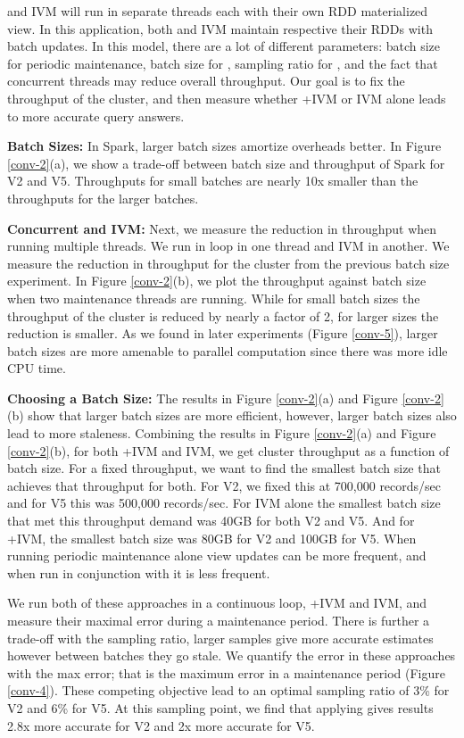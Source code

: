 \svc and IVM will run in separate threads each with their own RDD materialized view.
In this application, both \svc and IVM maintain respective their RDDs with batch updates.
In this model, there are a lot of different parameters: batch size for periodic maintenance, batch size for \svc, sampling ratio for \svc, and the fact that concurrent threads may reduce overall throughput.
Our goal is to fix the throughput of the cluster, and then measure whether \svcnospace+IVM or IVM alone leads to more accurate query answers.

\textbf{Batch Sizes:} In Spark, larger batch sizes amortize overheads better.
In Figure \ref{conv-2}(a), we show a trade-off between batch size and throughput of Spark for V2 and V5.
Throughputs for small batches are nearly 10x smaller than the throughputs for the larger batches. 

\textbf{Concurrent \svc and IVM:} Next, we measure the reduction in throughput when running multiple threads.
We run  in loop in one thread and IVM in another.
We measure the reduction in throughput for the cluster from the previous batch size experiment.
In Figure \ref{conv-2}(b), we plot the throughput against batch size when two maintenance threads are running.
While for small batch sizes the throughput of the cluster is reduced by nearly a factor of 2, for larger sizes the reduction is
smaller.
As we found in later experiments (Figure \ref{conv-5}), larger batch sizes are more amenable to parallel computation since there was more idle CPU time.


\textbf{Choosing a Batch Size:}
The results in Figure \ref{conv-2}(a) and Figure \ref{conv-2}(b) show that larger batch sizes are more efficient, however, larger batch sizes also lead to more staleness.
Combining the results in Figure \ref{conv-2}(a) and Figure \ref{conv-2}(b), for both \svcnospace+IVM and IVM, we get cluster throughput as a function of batch size.
For a fixed throughput, we want to find the smallest batch size that achieves that throughput for both.
For V2, we fixed this at 700,000 records/sec and for V5 this was 500,000 records/sec.
For IVM alone the smallest batch size that met this throughput demand was 40GB for both V2 and V5.
And for \svcnospace+IVM, the smallest batch size was 80GB for V2 and 100GB for V5. 
When running periodic maintenance alone view updates can be more frequent, and when run in conjunction with \svc it is less frequent. 

We run both of these approaches in a continuous loop, \svcnospace+IVM and IVM, and measure their maximal error during a maintenance period.
There is further a trade-off with the sampling ratio, larger samples give more accurate estimates however between \svc batches they go stale.
We quantify the error in these approaches with the max error; that is the maximum error in a maintenance period (Figure \ref{conv-4}).
These competing objective lead to an optimal sampling ratio of 3\% for V2 and 6\% for V5.
At this sampling point, we find that applying \svc gives results 2.8x more accurate for V2 and 2x more accurate for V5.

